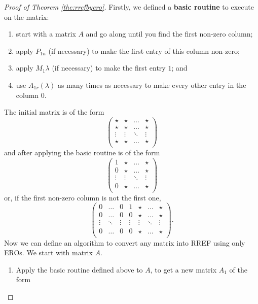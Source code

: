 \begin{proof}[Proof of Theorem \ref{the:rrefbyero}]
    Firstly, we defined a \textbf{basic routine} to execute on the matrix:
    \begin{enumerate}
        \item start with a matrix $A$ and go along until you find the first non-zero column;
        \item apply $P_{1n}$ (if necessary) to make the first entry of this column non-zero;
        \item apply $M_1{\lambda}$ (if necessary) to make the first entry $1$; and
        \item use $A_{1r}(\lambda)$ as many times as necessary to make every other entry in the column $0$.
    \end{enumerate}
    The initial matrix is of the form
    \[
        \begin{pmatrix}
            \star&\star&\ldots&\star\\
            \star&\star&\ldots&\star\\
            \vdots&\vdots&\ddots&\vdots\\
            \star&\star&\ldots&\star\\
        \end{pmatrix}
    \]
    and after applying the basic routine is of the form
    \[
        \begin{pmatrix}
            1&\star&\ldots&\star\\
            0&\star&\ldots&\star\\
            \vdots&\vdots&\ddots&\vdots\\
            0&\star&\ldots&\star\\
        \end{pmatrix}
    \]
    or, if the first non-zero column is not the first one,
    \[
        \begin{pmatrix}
            0&\ldots&0&1&\star&\ldots&\star\\
            0&\ldots&0&0&\star&\ldots&\star\\
            \vdots&\ddots&\vdots&\vdots&\vdots&\ddots&\vdots\\
            0&\ldots&0&0&\star&\ldots&\star\\
        \end{pmatrix}
        .
    \]
    Now we can define an algorithm to convert any matrix into RREF using only EROs. We start with matrix $A$.
    \begin{enumerate}
        \item Apply the basic routine defined above to $A$, to get a new matrix $A_1$ of the form

\end{enumerate}
\end{proof}
